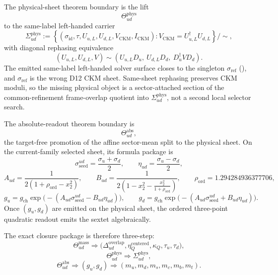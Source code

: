 The physical-sheet theorem boundary is the lift
\[
\Theta_{ud}^{\mathrm{phys}}
\]
to the same-label left-handed carrier
\[
\Sigma_{ud}^{\mathrm{phys}}
:=
\left\{
(\sigma_{\mathrm{id}},\tau,U_{u,L},U_{d,L},V_{\mathrm{CKM}},I_{\mathrm{CKM}})
:
V_{\mathrm{CKM}}=U_{u,L}^\dagger U_{d,L}
\right\}/\!\sim,
\]
with diagonal rephasing equivalence
\[
(U_{u,L},U_{d,L},V)\sim
(U_{u,L}D_u,\ U_{d,L}D_d,\ D_u^\dagger V D_d).
\]
The emitted same-label left-handed solver surface closes to the singleton \(\sigma_{\mathrm{ref}}\) (), and \(\sigma_{\mathrm{ref}}\) is the wrong D12 CKM sheet. Same-sheet rephasing preserves CKM moduli, so the missing physical object is a sector-attached section of the common-refinement frame-overlap quotient into \(\Sigma_{ud}^{\mathrm{phys}}\), not a second local selector search.

The absolute-readout theorem boundary is
\[
\Theta_{ud}^{\mathrm{abs}},
\]
the target-free promotion of the affine sector-mean split to the physical sheet. On the current-family selected sheet, its formula package is
\[
\sigma_{\mathrm{seed}}^{ud}=\frac{\sigma_u+\sigma_d}{2},
\qquad
\eta_{ud}=\frac{\sigma_u-\sigma_d}{2},
\]
\[
A_{ud}=\frac{1}{2(1+\rho_{\mathrm{ord}}-x_2^2)},
\qquad
B_{ud}=\frac{1}{2\!\left(1-x_2^2-\frac{x_2^2}{1+\rho_{\mathrm{ord}}}\right)},
\qquad
\rho_{\mathrm{ord}}=1.294284936377706,
\]
\[
g_u
=
g_{\mathrm{ch}}
\exp\!\bigl(-(A_{ud}\sigma_{\mathrm{seed}}^{ud}-B_{ud}\eta_{ud})\bigr),
\qquad
g_d
=
g_{\mathrm{ch}}
\exp\!\bigl(-(A_{ud}\sigma_{\mathrm{seed}}^{ud}+B_{ud}\eta_{ud})\bigr).
\]
Once \((g_u,g_d)\) are emitted on the physical sheet, the ordered three-point quadratic readout emits the sextet algebraically.

The exact closure package is therefore three-step:
\[
\Theta_{ud}^{\mathrm{mass}}
\Longrightarrow
\bigl(\Delta_{ud}^{\mathrm{overlap}},\eta_Q^{\mathrm{centered}},\kappa_Q,\tau_u,\tau_d\bigr),
\]
\[
\Theta_{ud}^{\mathrm{phys}}
\Longrightarrow
\Sigma_{ud}^{\mathrm{phys}},
\]
\[
\Theta_{ud}^{\mathrm{abs}}
\Longrightarrow
(g_u,g_d)
\Longrightarrow
(m_u,m_d,m_s,m_c,m_b,m_t).
\]

